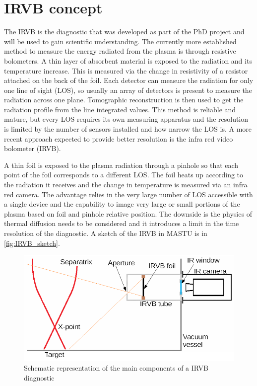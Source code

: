 \section{IRVB concept}
The IRVB is the diagnostic that was developed as part of the PhD project and will be used to gain scientific understanding.
The currently more established method to measure the energy radiated from the plasma is through resistive bolometers. A thin layer of absorbent material is exposed to the radiation and its temperature increase. This is measured via the change in resistivity of a resistor attached on the back of the foil. Each detector can measure the radiation for only one line of sight (LOS), so usually an array of detectors is present to measure the radiation across one plane. Tomographic reconstruction is then used to get the radiation profile from the line integrated values. This method is reliable and mature, but every LOS requires its own measuring apparatus and the resolution is limited by the number of sensors installed and how narrow the LOS is. A more recent approach expected to provide better resolution is the infra red video bolometer (IRVB). 

A thin foil is exposed to the plasma radiation through a pinhole so that each point of the foil corresponds to a different LOS. The foil heats up according to the radiation it receives and the change in temperature is measured via an infra red camera. The advantage relies in the very large number of LOS accessible with a single device and the capability to image very large or small portions of the plasma based on foil and pinhole relative position. The downside is the physics of thermal diffusion needs to be considered and it introduces a limit in the time resolution of the diagnostic. A sketch of the IRVB in MASTU is in \autoref{fig:IRVB_sketch}.

\begin{figure}
	\centering
	\includegraphics[width=\linewidth]{Chapters/chapter2/figs/IRVB cartoon.png}
	\caption{Schematic representation of the main components of a IRVB diagnostic}
	\label{fig:IRVB_sketch}
\end{figure}

